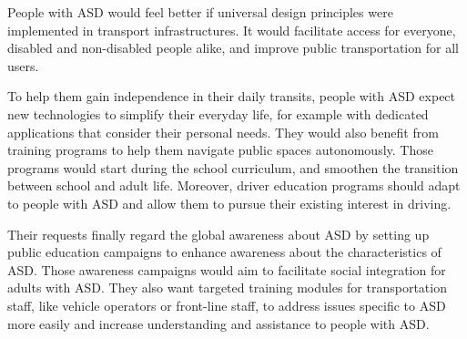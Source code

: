 People with ASD would feel better if universal design principles were implemented in transport infrastructures\cite{2020ExperiencesYoungAutistic}. It would facilitate access for everyone, disabled and non-disabled people alike, and improve public transportation for all users.

To help them gain independence in their daily transits, people with ASD expect new technologies to simplify their everyday life, for example with dedicated applications that consider their personal needs. They would also benefit from training programs to help them navigate public spaces autonomously. Those programs would start during the school curriculum, and smoothen the transition between school and adult life\cite{2015DetourRightPlace}. Moreover, driver education programs should adapt to people with ASD and allow them to pursue their existing interest in driving\cite{2015DetourRightPlace}. 

Their requests finally regard the global awareness about ASD by setting up public education campaigns to enhance awareness about the characteristics of ASD. Those awareness campaigns would aim to facilitate social integration for adults with ASD\cite{2015DetourRightPlace}. They also want targeted training modules for transportation staff, like vehicle operators or front-line staff, to address issues specific to ASD more easily and increase understanding and assistance to people with ASD\cite{2020ExperiencesYoungAutistic}. 
